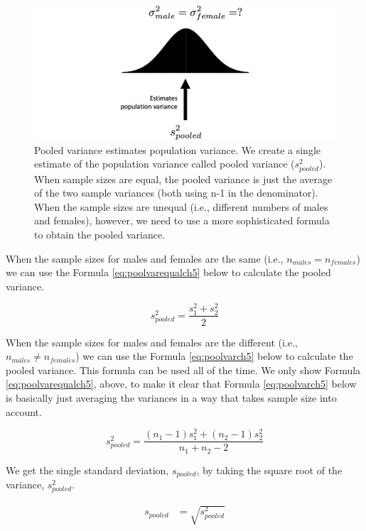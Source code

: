 \documentclass[
]{krantz}
\begin{document}
\begin{figure}
\includegraphics[width=0.8\linewidth]{ch_samples/images/pool3} \caption[Pooled variance estimates population variance]{Pooled variance estimates population variance. We create a single estimate of the population variance called pooled variance ($s_{pooled}^2$). When sample sizes are equal, the pooled variance is just the average of the two sample variances (both using n-1 in the denominator). When the sample sizes are unequal (i.e., different numbers of males and females), however, we need to use a more sophisticated formula to obtain the pooled variance.}\label{fig:pool3}
\end{figure}

When the sample sizes for males and females are the same (i.e., \(n_{males} =n_{females}\)) we can use the Formula \eqref{eq:poolvarequalch5} below to calculate the pooled variance.

\begin{equation} 
s_{pooled}^2  = \frac{s_{1}^2 + s_{2}^2}{2} 
      \label{eq:poolvarequalch5}
\end{equation}

When the sample sizes for males and females are the different (i.e., \(n_{males} \ne n_{females}\)) we can use the Formula \eqref{eq:poolvarch5} below to calculate the pooled variance. This formula can be used all of the time. We only show Formula \eqref{eq:poolvarequalch5}, above, to make it clear that Formula \eqref{eq:poolvarch5} below is basically just averaging the variances in a way that takes sample size into account.

\begin{equation} 
s_{pooled}^2  = \frac{(n_1 -1)s_1^2 + (n_2 -1)s_2^2}{n_1 + n_2-2}
      \label{eq:poolvarch5}
\end{equation}

We get the single standard deviation, \(s_{pooled}\), by taking the square root of the variance, \(s_{pooled}^2\).

\[
\begin{aligned} 
s_{pooled}  &= \sqrt{s_{pooled}^2} \\
\end{aligned} 
\]
\end{document}
